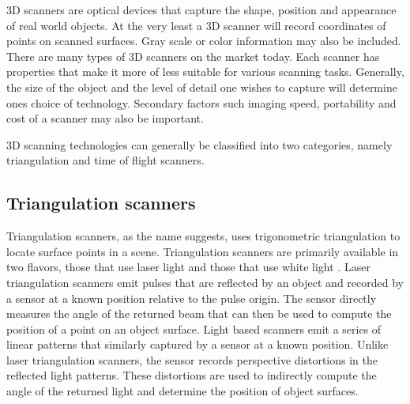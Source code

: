 3D scanners are optical devices that capture the shape, position and appearance of real world objects. At the very least a 3D scanner will record coordinates of points on scanned surfaces. Gray scale or color information may also be included. There are many types of 3D scanners on the market today. Each scanner has properties that make it more of less suitable for various scanning tasks. Generally, the size of the object and the level of detail one wishes to capture will determine ones choice of technology. Secondary factors such imaging speed, portability and cost of a scanner may also be important.

3D scanning technologies can generally be classified into two categories, namely triangulation and time of flight scanners.

\subsection{Triangulation scanners}

Triangulation scanners, as the name suggests, uses trigonometric triangulation \cite{Frohlich2004} to locate surface points in a scene. Triangulation scanners are primarily available in two flavors, those that use laser light and those that use white light \cite{Brown2012}. Laser triangulation scanners emit pulses that are reflected by an object and recorded by a sensor at a known position relative to the pulse origin. The sensor directly measures the angle of the returned beam that can then be used to compute the position of a point on an object surface. Light based scanners emit a series of linear patterns that similarly captured by a sensor at a known position. Unlike laser triangulation scanners, the sensor records perspective distortions in the reflected light patterns. These distortions are used to indirectly compute the angle of the returned light and determine the position of object surfaces.

